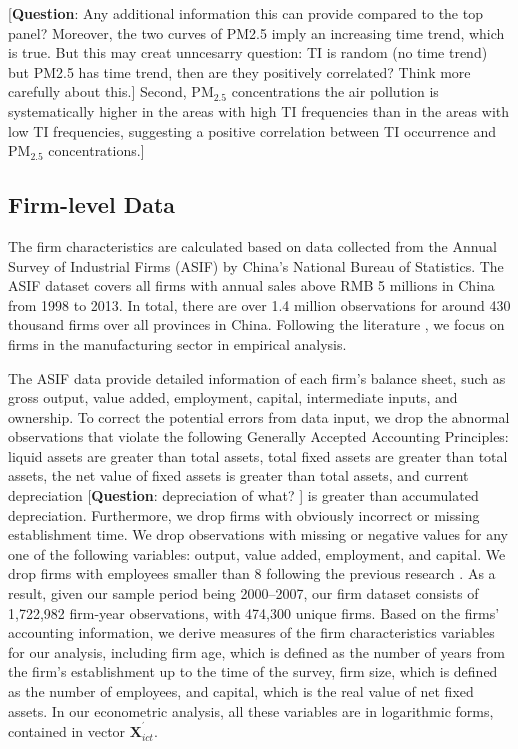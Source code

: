 \documentclass[12pt]{article}
\begin{document}
[\textbf{Question}: Any additional information this can provide compared to
the top panel? Moreover, the two curves of PM2.5 imply an increasing time
trend, which is true. But this may creat unncesarry question: TI is random
(no time trend) but PM2.5 has time trend, then are they positively
correlated? Think more carefully about this.] Second,  $\mathrm{PM_{2.5}}$
concentrations the air pollution is systematically higher in the areas with
high TI frequencies than in the areas with low TI frequencies, suggesting a
positive correlation between TI occurrence and $\mathrm{PM_{2.5}}$
concentrations.]

\subsection{Firm-level Data}

\label{sec:data_firm} The firm characteristics are calculated based on data
collected from the Annual Survey of Industrial Firms (ASIF) by China's
National Bureau of Statistics. The ASIF dataset covers all firms with annual
sales above RMB 5 millions in China from 1998 to 2013. In total, there are
over 1.4 million observations for around 430 thousand firms over all
provinces in China. Following the literature \citep[e.g.,][]{fu2021trans},
we focus on firms in the manufacturing sector in empirical analysis.

The ASIF data provide detailed information of each firm's balance sheet,
such as gross output, value added, employment, capital, intermediate inputs,
and ownership. To correct the potential errors from data input, we drop the
abnormal observations that violate the following Generally Accepted
Accounting Principles: liquid assets are greater than total assets, total
fixed assets are greater than total assets, the net value of fixed assets is
greater than total assets, and current depreciation [\textbf{Question}:
depreciation of what? ] is greater than accumulated depreciation.
Furthermore, we drop firms with obviously incorrect or missing establishment
time. We drop observations with missing or negative values for any one of
the following variables: output, value added, employment, and capital. We
drop firms with employees smaller than 8 following the previous research %
\citep{brandt2012creative}. As a result, given our sample period being
2000--2007, our firm dataset consists of 1,722,982 firm-year observations,
with 474,300 unique firms. Based on the firms' accounting information, we
derive measures of the firm characteristics variables for our analysis,
including firm age, which is defined as the number of years from the firm's
establishment up to the time of the survey, firm size, which is defined as
the number of employees, and capital, which is the real value of net fixed
assets. In our econometric analysis, all these variables are in logarithmic
forms, contained in vector $\mathbf{X}_{ict}^{^{\prime }}.$
\end{document}
